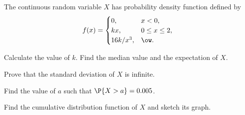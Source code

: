 \begin{problem}
    The continuous random variable $X$ has probability density function defined by \[f(x) = \begin{cases}
        0, & x < 0,\\
        kx, & 0 \leq x \leq 2,\\
        16k/x^3, & \ow.
    \end{cases}\]

    Calculate the value of $k$. Find the median value and the expectation of $X$.
    
    Prove that the standard deviation of $X$ is infinite.
    
    Find the value of $a$ such that $\P{X>a}=0.005$.
    
    Find the cumulative distribution function of $X$ and sketch its graph.
\end{problem}
